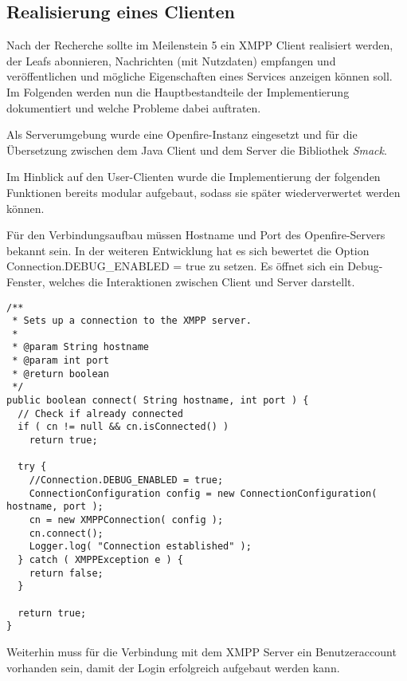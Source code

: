 \subsection{Realisierung eines Clienten}

Nach der Recherche sollte im Meilenstein 5 ein XMPP Client realisiert werden, der Leafs abonnieren, Nachrichten (mit Nutzdaten) empfangen und veröffentlichen und mögliche Eigenschaften eines Services anzeigen können soll.\\
Im Folgenden werden nun die Hauptbestandteile der Implementierung dokumentiert und welche Probleme dabei auftraten.

\vspace{0.2cm}

Als Serverumgebung wurde eine Openfire-Instanz eingesetzt und für die Übersetzung zwischen dem Java Client und dem Server die Bibliothek \textit{Smack}.

\vspace{0.2cm}

Im Hinblick auf den User-Clienten wurde die Implementierung der folgenden Funktionen bereits modular aufgebaut, sodass sie später wiederverwertet werden können.

\vspace{0.2cm}

Für den Verbindungsaufbau müssen Hostname und Port des Openfire-Servers bekannt sein. In der weiteren Entwicklung hat es sich bewertet die Option \textsf{Connection.DEBUG\_ENABLED = true} zu setzen. Es öffnet sich ein Debug-Fenster, welches die Interaktionen zwischen Client und Server darstellt.

\begin{lstlisting}[label=xmppconnect,caption=Auszug aus ConnectionHandler für den Verbindungsaufbau]
/**
 * Sets up a connection to the XMPP server.
 *
 * @param String hostname
 * @param int port
 * @return boolean
 */
public boolean connect( String hostname, int port ) {
  // Check if already connected
  if ( cn != null && cn.isConnected() )
    return true;

  try {
    //Connection.DEBUG_ENABLED = true;
    ConnectionConfiguration config = new ConnectionConfiguration( hostname, port );
    cn = new XMPPConnection( config );
    cn.connect();
    Logger.log( "Connection established" );
  } catch ( XMPPException e ) {
    return false;
  }

  return true;
}
\end{lstlisting}

Weiterhin muss für die Verbindung mit dem XMPP Server ein Benutzeraccount vorhanden sein, damit der Login erfolgreich aufgebaut werden kann.

